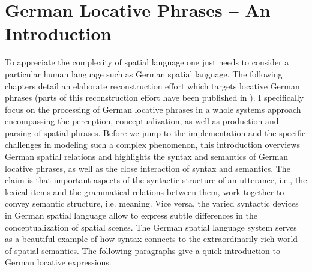 
%

\chapter{German Locative Phrases -- An Introduction}
\label{s:german-spatial-language-introduction}

To appreciate the complexity of spatial language one just needs
to consider a particular human language such as German spatial language.
The following chapters detail an elaborate reconstruction 
effort which targets locative German phrases (parts of this reconstruction
effort have been published in \citealp{spranger2011german}). 
I specifically focus on the processing of German locative phrases 
in a whole systems approach encompassing the perception, conceptualization,
as well as production and parsing of spatial phrases.
Before we jump to the implementation and the specific
challenges in modeling such a complex phenomenon, this introduction
overviews German spatial relations and highlights the syntax and 
semantics of German locative phrases, as well as the
close interaction of syntax and semantics. 
The claim is that important aspects of the syntactic structure of an utterance, i.e., 
the lexical items and the grammatical relations between them, work together to convey 
semantic structure, i.e. meaning. Vice versa, the varied syntactic 
devices in German spatial language allow to express subtle differences
in the conceptualization of spatial scenes. The German spatial language system serves 
as a beautiful example of how syntax connects to the extraordinarily rich world of 
spatial semantics. The following paragraphs give a quick introduction to 
German locative expressions. 


